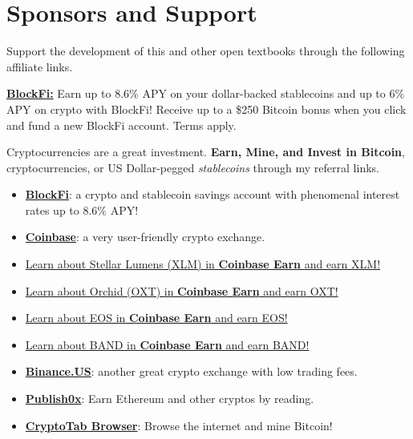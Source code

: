 \chapter*{Sponsors and Support}

Support the development of this and other open textbooks through the following affiliate links.

\href{https://blockfi.mxuy67.net/c/2612759/907789/10568}{{\bf BlockFi:}} Earn up to 8.6\% APY on your dollar-backed stablecoins and up to 6\% APY on crypto with BlockFi! Receive up to a \$250 Bitcoin bonus when you click and fund a new BlockFi account. Terms apply.


\noindent Cryptocurrencies are a great investment. {\bf Earn, Mine, and Invest in Bitcoin}, cryptocurrencies, or US Dollar-pegged {\em stablecoins} through my referral links.
\begin{itemize}   
   \item \href{https://blockfi.mxuy67.net/c/2612759/889697/10568}{{\bf BlockFi}}: a crypto and stablecoin savings account with phenomenal interest rates up to 8.6\% APY! 
   \item \href{https://www.coinbase.com/join/landqu_e}{{\bf Coinbase}}: a very user-friendly crypto exchange.
   \item \href{https://coinbase.com/earn/xlm/invite/cq8rgxt4}{Learn about Stellar Lumens (XLM) in {\bf Coinbase Earn} and earn XLM!}
   \item \href{https://coinbase.com/earn/oxt/invite/39h7v158}{Learn about Orchid (OXT) in {\bf Coinbase Earn} and earn OXT!}
   \item \href{https://coinbase.com/earn/eos/invite/8b95vgnx}{Learn about EOS in {\bf Coinbase Earn} and earn EOS!}
   \item \href{https://coinbase.com/earn/band/invite/2s49zc65}{Learn about BAND in {\bf Coinbase Earn} and earn BAND!}
   \item \href{https://www.binance.us/?ref=35061022}{{\bf Binance.US}}: another great crypto exchange with low trading fees.
   \item \href{https://www.publish0x.com?a=Jxbo2qkAag}{{\bf Publish0x}}: Earn Ethereum and other cryptos by reading.
   \item \href{https://cryptotabbrowser.com/16356908}{{\bf CryptoTab Browser}}: Browse the internet and mine Bitcoin!
\end{itemize}

